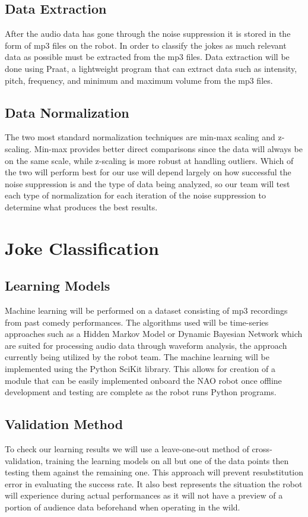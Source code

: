 \documentclass[onecolumn, draftclsnofoot,10pt, compsoc]{IEEEtran}
\begin{document}
\subsection{Data Extraction}
After the audio data has gone through the noise suppression it is stored in the form of mp3 files on the robot. In order to classify the jokes as much relevant data as possible must be extracted from the mp3 files. Data extraction will be done using Praat, a lightweight program that can extract data such as intensity, pitch, frequency, and minimum and maximum volume from the mp3 files.
\subsection{Data Normalization}
The two most standard normalization techniques are min-max scaling and z-scaling. Min-max provides better direct comparisons since the data will always be on the same scale, while z-scaling is more robust at handling outliers. Which of the two will perform best for our use will depend largely on how successful the noise suppression is and the type of data being analyzed, so our team will test each type of normalization for each iteration of the noise suppression to determine what produces the best results.

\section{Joke Classification}
\subsection{Learning Models}
Machine learning will be performed on a dataset consisting of mp3 recordings from past comedy performances. The algorithms used will be time-series approaches such as a Hidden Markov Model or Dynamic Bayesian Network which are suited for processing audio data through waveform analysis, the approach currently being utilized by the robot team. The machine learning will be implemented using the Python SciKit library. This allows for creation of a module that can be easily implemented onboard the NAO robot once offline development and testing are complete as the robot runs Python programs.
\subsection{Validation Method}
To check our learning results we will use a leave-one-out method of cross-validation, training the learning models on all but one of the data points then testing them against the remaining one. This approach will prevent resubstitution error in evaluating the success rate. It also best represents the situation the robot will experience during actual performances as it will not have a preview of a portion of audience data beforehand when operating in the wild.
\end{document}
